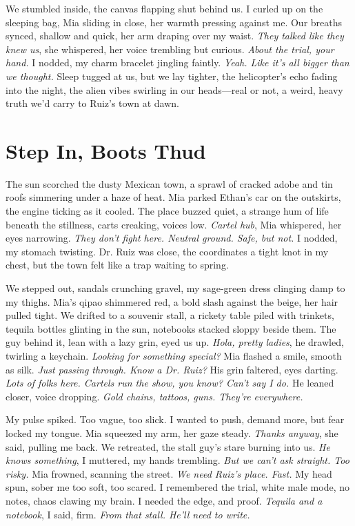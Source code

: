 \documentclass[12pt,oneside]{book} %
\begin{document}
We stumbled inside, the canvas flapping shut behind us. I curled up on the sleeping bag, Mia sliding in close, her warmth pressing against me. Our breaths synced, shallow and quick, her arm draping over my waist. \textit{They talked like they knew us}, she whispered, her voice trembling but curious. \textit{About the trial, your hand.} I nodded, my charm bracelet jingling faintly. \textit{Yeah. Like it’s all bigger than we thought.} Sleep tugged at us, but we lay tighter, the helicopter’s echo fading into the night, the alien vibes swirling in our heads—real or not, a weird, heavy truth we’d carry to Ruiz’s town at dawn.

\chapter{Step In, Boots Thud}

The sun scorched the dusty Mexican town, a sprawl of cracked adobe and tin roofs simmering under a haze of heat. Mia parked Ethan’s car on the outskirts, the engine ticking as it cooled. The place buzzed quiet, a strange hum of life beneath the stillness, carts creaking, voices low. \textit{Cartel hub}, Mia whispered, her eyes narrowing. \textit{They don’t fight here. Neutral ground. Safe, but not.} I nodded, my stomach twisting. Dr. Ruiz was close, the coordinates a tight knot in my chest, but the town felt like a trap waiting to spring.

We stepped out, sandals crunching gravel, my sage-green dress clinging damp to my thighs. Mia’s qipao shimmered red, a bold slash against the beige, her hair pulled tight. We drifted to a souvenir stall, a rickety table piled with trinkets, tequila bottles glinting in the sun, notebooks stacked sloppy beside them. The guy behind it, lean with a lazy grin, eyed us up. \textit{Hola, pretty ladies}, he drawled, twirling a keychain. \textit{Looking for something special?} Mia flashed a smile, smooth as silk. \textit{Just passing through. Know a Dr. Ruiz?} His grin faltered, eyes darting. \textit{Lots of folks here. Cartels run the show, you know? Can’t say I do.} He leaned closer, voice dropping. \textit{Gold chains, tattoos, guns. They’re everywhere.}

My pulse spiked. Too vague, too slick. I wanted to push, demand more, but fear locked my tongue. Mia squeezed my arm, her gaze steady. \textit{Thanks anyway}, she said, pulling me back. We retreated, the stall guy’s stare burning into us. \textit{He knows something}, I muttered, my hands trembling. \textit{But we can’t ask straight. Too risky.} Mia frowned, scanning the street. \textit{We need Ruiz’s place. Fast.} My head spun, sober me too soft, too scared. I remembered the trial, white male mode, no notes, chaos clawing my brain. I needed the edge, and proof. \textit{Tequila and a notebook}, I said, firm. \textit{From that stall. He’ll need to write.}
\end{document}

